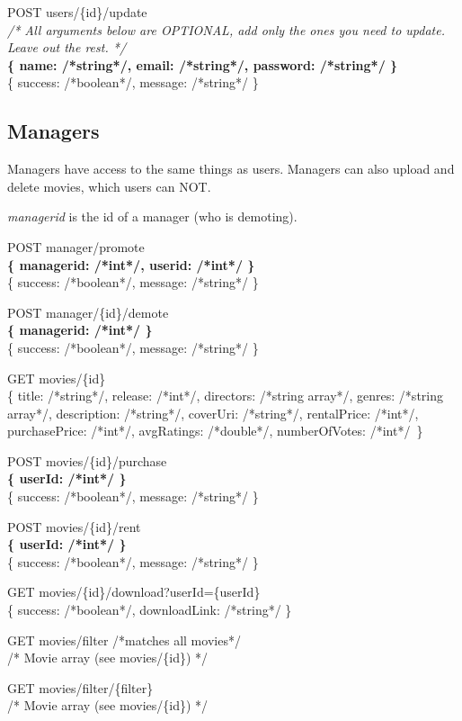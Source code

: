 POST users/\{id\}/update\\
\emph{/* All arguments below are OPTIONAL, add only the ones you need to update. Leave out the rest. */} \\
\textbf{\{ name: /*string*/, email: /*string*/, password: /*string*/ \}\\}
\{ success: /*boolean*/, message: /*string*/ \}

\subsection{Managers}

Managers have access to the same things as users. Managers can also upload and delete movies, which users can NOT.

\emph{managerid} is the id of a manager (who is demoting).

POST manager/promote\\
\textbf{\{ managerid: /*int*/, userid: /*int*/ \}} \\
\{ success: /*boolean*/, message: /*string*/ \}

POST manager/\{id\}/demote \\
\textbf{\{ managerid: /*int*/ \}} \\
\{ success: /*boolean*/, message: /*string*/ \}

GET  movies/\{id\} \\
\{ title: /*string*/, release: /*int*/, directors: /*string array*/, genres: /*string array*/, description: /*string*/, coverUri: /*string*/, rentalPrice: /*int*/, purchasePrice: /*int*/, avgRatings: /*double*/, numberOfVotes: /*int*/\ \}

POST movies/\{id\}/purchase \\
\textbf{\{ userId: /*int*/ \}} \\
\{ success: /*boolean*/, message: /*string*/ \}

POST movies/\{id\}/rent \\
\textbf{\{ userId: /*int*/ \}} \\
\{ success: /*boolean*/, message: /*string*/ \}

GET movies/\{id\}/download?userId=\{userId\} \\
\{ success: /*boolean*/, downloadLink: /*string*/ \}

GET  movies/filter /*matches all movies*/ \\
/* Movie array (see movies/\{id\}) */

GET  movies/filter/\{filter\} \\
/* Movie array (see movies/\{id\}) */

